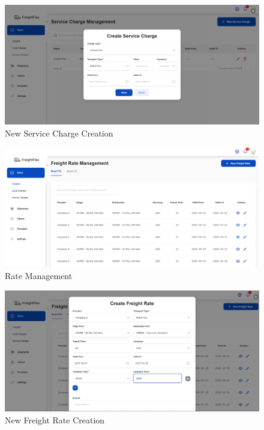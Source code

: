 \begin{figure}[H]
    \centering
    \includegraphics[width=15cm]{graphics/UI/new-service-charge.png}
    \caption{New Service Charge Creation}
    \label{fig:new-service-charge}
\end{figure}

\begin{figure}[H]
    \centering
    \includegraphics[width=15cm]{graphics/UI/rate-management.png}
    \caption{Rate Management}
    \label{fig:rate-management}
\end{figure}

\begin{figure}[H]
    \centering
    \includegraphics[width=15cm]{graphics/UI/new-freight-rate.png}
    \caption{New Freight Rate Creation}
    \label{fig:new-freight-rate}
\end{figure}

